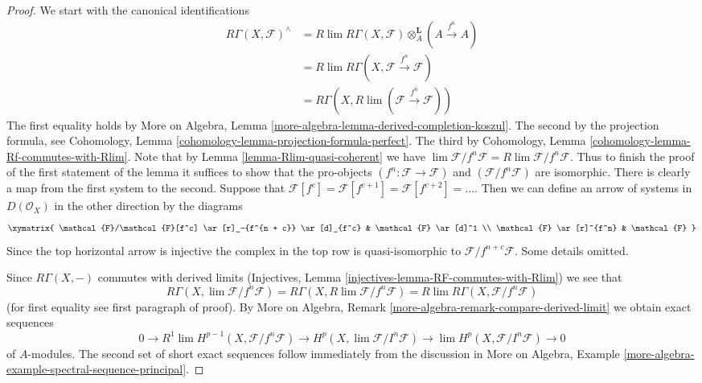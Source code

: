 \begin{proof}
We start with the canonical identifications
\begin{align*}
R\Gamma(X, \mathcal{F})^\wedge
& =
R\lim R\Gamma(X, \mathcal{F}) \otimes_A^\mathbf{L} (A \xrightarrow{f^n} A) \\
& =
R\lim R\Gamma(X, \mathcal{F} \xrightarrow{f^n} \mathcal{F}) \\
& =
R\Gamma(X, R\lim (\mathcal{F} \xrightarrow{f^n} \mathcal{F}))
\end{align*}
The first equality holds by
More on Algebra, Lemma \ref{more-algebra-lemma-derived-completion-koszul}.
The second by the projection formula, see 
Cohomology, Lemma \ref{cohomology-lemma-projection-formula-perfect}.
The third by Cohomology, Lemma
\ref{cohomology-lemma-Rf-commutes-with-Rlim}.
Note that by Lemma \ref{lemma-Rlim-quasi-coherent} we have
$\lim \mathcal{F}/f^n\mathcal{F} = R\lim \mathcal{F}/f^n \mathcal{F}$.
Thus to finish the proof of the first statement of the lemma it suffices to
show that the pro-objects $(f^n : \mathcal{F} \to \mathcal{F})$
and $(\mathcal{F}/f^n \mathcal{F})$ are isomorphic. There is clearly
a map from the first system to the second. Suppose that
$\mathcal{F}[f^c] = \mathcal{F}[f^{c + 1}] = \mathcal{F}[f^{c + 2}] = \ldots$.
Then we can define an arrow of systems in $D(\mathcal{O}_X)$
in the other direction by the diagrams
$$
\xymatrix{
\mathcal{F}/\mathcal{F}[f^c] \ar[r]_-{f^{n + c}} \ar[d]_{f^c} &
\mathcal{F} \ar[d]^1 \\
\mathcal{F} \ar[r]^{f^n} & \mathcal{F}
}
$$
Since the top horizontal arrow is injective the complex
in the top row is quasi-isomorphic to $\mathcal{F}/f^{n + c}\mathcal{F}$.
Some details omitted.

\medskip\noindent
Since $R\Gamma(X, -)$ commutes with derived limits
(Injectives, Lemma \ref{injectives-lemma-RF-commutes-with-Rlim})
we see that
$$
R\Gamma(X, \lim \mathcal{F}/f^n\mathcal{F}) =
R\Gamma(X, R\lim \mathcal{F}/f^n\mathcal{F}) =
R\lim R\Gamma(X, \mathcal{F}/f^n\mathcal{F})
$$
(for first equality see first paragraph of proof).
By More on Algebra, Remark \ref{more-algebra-remark-compare-derived-limit}
we obtain exact sequences
$$
0 \to
R^1\lim H^{p - 1}(X, \mathcal{F}/f^n\mathcal{F}) \to
H^p(X, \lim \mathcal{F}/I^n\mathcal{F}) \to
\lim H^p(X, \mathcal{F}/I^n\mathcal{F}) \to 0
$$
of $A$-modules. The second set of short exact sequences follow immediately
from the discussion in More on Algebra, Example
\ref{more-algebra-example-spectral-sequence-principal}.
\end{proof}
















